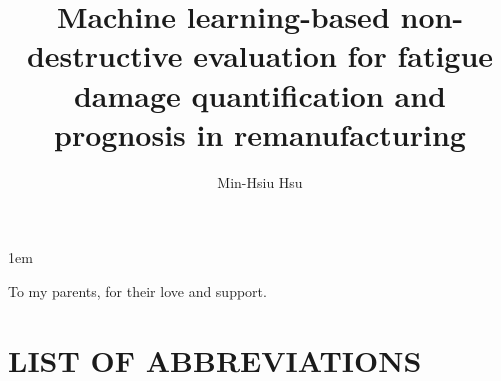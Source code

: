 \documentclass[draftthesis,tocnosub,noragright,centerchapter,12pt, mixcasechap]{uiucecethesis09}
\title{Machine learning-based non-destructive evaluation for fatigue damage quantification and prognosis in remanufacturing}
\author{Min-Hsiu Hsu}
\begin{document}
%

%
\maketitle

\parindent 1em%

\frontmatter

%
\begin{abstract}

\end{abstract}


%
\begin{dedication}
To my parents, for their love and support.
\end{dedication}

%
\begin{acknowledgments}

\end{acknowledgments}

%
\tableofcontents

%
\listoftables

%
\listoffigures

%
\chapter{LIST OF ABBREVIATIONS}
\end{document}
